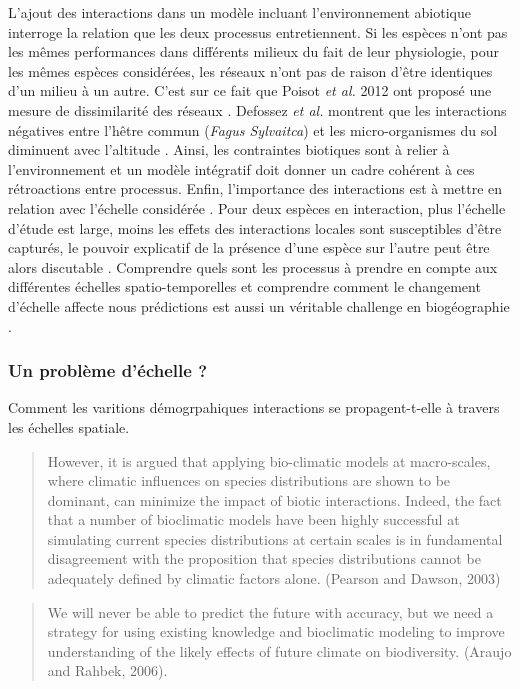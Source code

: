 L'ajout des interactions dans un modèle incluant l'environnement
abiotique interroge la relation que les deux processus entretiennent. Si
les espèces n'ont pas les mêmes performances dans différents milieux du
fait de leur physiologie, pour les mêmes espèces considérées, les
réseaux n'ont pas de raison d'être identiques d'un milieu à un autre.
C'est sur ce fait que Poisot \textit{et al.} 2012 ont proposé une mesure
de dissimilarité des réseaux \cite{Poisot2012}. Defossez \textit{et al.}
montrent que les interactions négatives entre l'hêtre commun
(\textit{Fagus Sylvaitca}) et les micro-organismes du sol diminuent avec
l'altitude \cite{Defossez2011}. Ainsi, les contraintes biotiques sont à
relier à l'environnement \cite{Brooker2006,Canham2006} et un modèle
intégratif doit donner un cadre cohérent à ces rétroactions entre
processus. Enfin, l'importance des interactions est à mettre en relation
avec l'échelle considérée \cite{Peterson2011}. Pour deux espèces en
interaction, plus l'échelle d'étude est large, moins les effets des
interactions locales sont susceptibles d'être capturés, le pouvoir
explicatif de la présence d'une espèce sur l'autre peut être alors
discutable \cite{Araujo2007}. Comprendre quels sont les processus à
prendre en compte aux différentes échelles spatio-temporelles et
comprendre comment le changement d'échelle affecte nous prédictions est
aussi un véritable challenge en biogéographie \cite{Martinez2012}.

\subsubsection{Un problème d'échelle
?}\label{un-probluxe8me-duxe9chelle}

Comment les varitions démogrpahiques interactions se propagent-t-elle à
travers les échelles spatiale.

\begin{quote}
However, it is argued that applying bio-climatic models at macro-scales,
where climatic influences on species distributions are shown to be
dominant, can minimize the impact of biotic interactions. Indeed, the
fact that a number of bioclimatic models have been highly successful at
simulating current species distributions at certain scales is in
fundamental disagreement with the proposition that species distributions
cannot be adequately defined by climatic factors alone. (Pearson and
Dawson, 2003)
\end{quote}

\begin{quote}
We will never be able to predict the future with accuracy, but we need a
strategy for using existing knowledge and bioclimatic modeling to
improve understanding of the likely effects of future climate on
biodiversity. (Araujo and Rahbek, 2006).
\end{quote}

